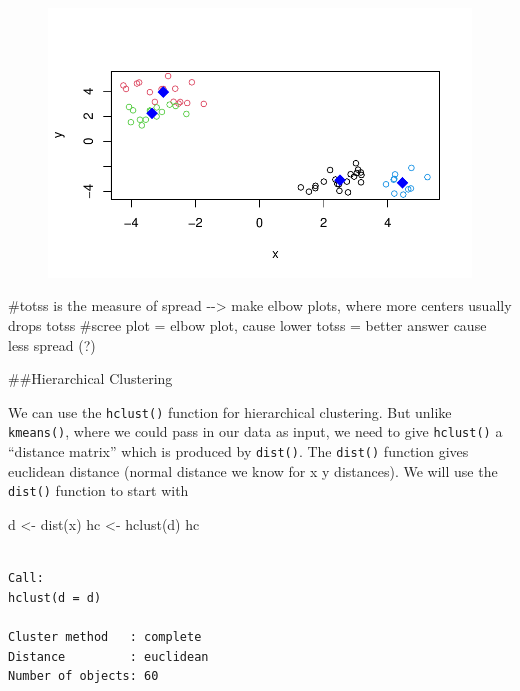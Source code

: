 \documentclass[
  letterpaper,
  DIV=11,
  numbers=noendperiod]{scrartcl}
\newenvironment{Shaded}{\begin{snugshade}}{\end{snugshade}}
\newcommand{\CommentTok}[1]{\textcolor[rgb]{0.37,0.37,0.37}{#1}}
\newcommand{\FunctionTok}[1]{\textcolor[rgb]{0.28,0.35,0.67}{#1}}
\newcommand{\NormalTok}[1]{\textcolor[rgb]{0.00,0.23,0.31}{#1}}
\newcommand{\OtherTok}[1]{\textcolor[rgb]{0.00,0.23,0.31}{#1}}
\begin{document}
\begin{figure}[H]

{\centering \includegraphics{Class07_files/figure-pdf/unnamed-chunk-7-1.pdf}

}

\end{figure}

\begin{Shaded}
\begin{Highlighting}[]
\CommentTok{\#totss is the measure of spread {-}{-}\textgreater{} make elbow plots, where more centers usually drops totss}
\CommentTok{\#scree plot = elbow plot, cause lower totss = better answer cause less spread (?)}
\end{Highlighting}
\end{Shaded}

\#\#Hierarchical Clustering

We can use the \texttt{hclust()} function for hierarchical clustering.
But unlike \texttt{kmeans()}, where we could pass in our data as input,
we need to give \texttt{hclust()} a ``distance matrix'' which is
produced by \texttt{dist()}. The \texttt{dist()} function gives
euclidean distance (normal distance we know for x y distances). We will
use the \texttt{dist()} function to start with

\begin{Shaded}
\begin{Highlighting}[]
\NormalTok{d }\OtherTok{\textless{}{-}} \FunctionTok{dist}\NormalTok{(x)}
\NormalTok{hc }\OtherTok{\textless{}{-}}  \FunctionTok{hclust}\NormalTok{(d)}
\NormalTok{hc}
\end{Highlighting}
\end{Shaded}

\begin{verbatim}

Call:
hclust(d = d)

Cluster method   : complete 
Distance         : euclidean 
Number of objects: 60 
\end{verbatim}
\end{document}
